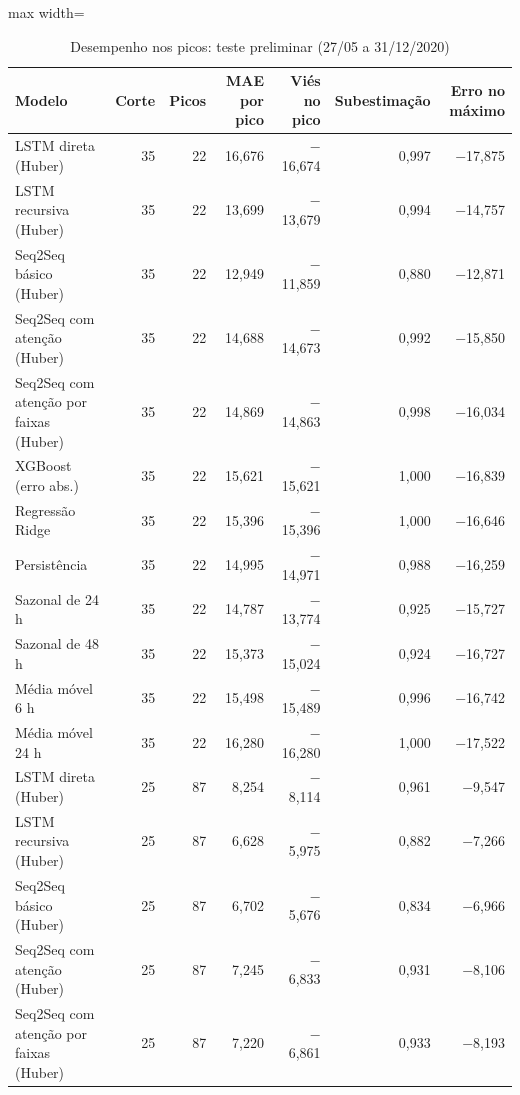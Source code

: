 \begin{table}[!htbp]
    \centering
    \caption{Desempenho nos picos: teste preliminar (27/05 a 31/12/2020)}
    \label{tab:eventos_teste_historico}
    \small
    \begin{adjustbox}{max width=\textwidth}
    \begin{tabular}{lrrrrrr}
        \toprule
        Modelo & Corte & Picos & MAE por pico & Viés no pico & Subestimação & Erro no máximo \\
        \midrule
        LSTM direta (Huber) & 35 & 22 & 16,676 & $-$16,674 & 0,997 & $-$17,875 \\
        LSTM recursiva (Huber) & 35 & 22 & 13,699 & $-$13,679 & 0,994 & $-$14,757 \\
        Seq2Seq básico (Huber) & 35 & 22 & 12,949 & $-$11,859 & 0,880 & $-$12,871 \\
        Seq2Seq com atenção (Huber) & 35 & 22 & 14,688 & $-$14,673 & 0,992 & $-$15,850 \\
        Seq2Seq com atenção por faixas (Huber) & 35 & 22 & 14,869 & $-$14,863 & 0,998 & $-$16,034 \\
        XGBoost (erro abs.) & 35 & 22 & 15,621 & $-$15,621 & 1,000 & $-$16,839 \\
        Regressão Ridge & 35 & 22 & 15,396 & $-$15,396 & 1,000 & $-$16,646 \\
        \midrule
        Persistência & 35 & 22 & 14,995 & $-$14,971 & 0,988 & $-$16,259 \\
        Sazonal de 24 h & 35 & 22 & 14,787 & $-$13,774 & 0,925 & $-$15,727 \\
        Sazonal de 48 h & 35 & 22 & 15,373 & $-$15,024 & 0,924 & $-$16,727 \\
        Média móvel 6 h & 35 & 22 & 15,498 & $-$15,489 & 0,996 & $-$16,742 \\
        Média móvel 24 h & 35 & 22 & 16,280 & $-$16,280 & 1,000 & $-$17,522 \\
        LSTM direta (Huber) & 25 & 87 & 8,254 & $-$8,114 & 0,961 & $-$9,547 \\
        LSTM recursiva (Huber) & 25 & 87 & 6,628 & $-$5,975 & 0,882 & $-$7,266 \\
        Seq2Seq básico (Huber) & 25 & 87 & 6,702 & $-$5,676 & 0,834 & $-$6,966 \\
        Seq2Seq com atenção (Huber) & 25 & 87 & 7,245 & $-$6,833 & 0,931 & $-$8,106 \\
        Seq2Seq com atenção por faixas (Huber) & 25 & 87 & 7,220 & $-$6,861 & 0,933 & $-$8,193 \\

\end{tabular}
\end{adjustbox}
\end{table}
